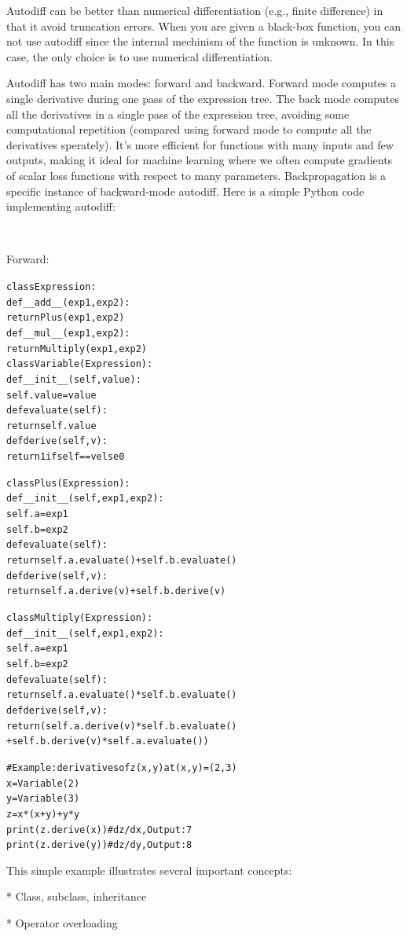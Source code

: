 \documentclass{article}
\newenvironment{tmcode}[1][]{\begin{alltt} }{\end{alltt}}
\begin{document}
Autodiff can be better than numerical differentiation (e.g., finite
difference) in that it avoid truncation errors. When you are given a black-box
function, you can not use autodiff since the internal mechinism of the
function is unknown. In this case, the only choice is to use numerical
differentiation.

Autodiff has two main modes: forward and backward. Forward mode computes a
single derivative during one pass of the expression tree. The back mode
computes all the derivatives in a single pass of the expression tree, avoiding
some computational repetition (compared using forward mode to compute all the
derivatives sperately). It's more efficient for functions with many inputs and
few outputs, making it ideal for machine learning where we often compute
gradients of scalar loss functions with respect to many parameters.
Backpropagation is a specific instance of backward-mode autodiff. Here is a
simple Python code implementing autodiff:

\

Forward:
\begin{tmcode}
class Expression:
    def __add__(exp1, exp2):
        return Plus(exp1, exp2)
    def __mul__(exp1, exp2):
        return Multiply(exp1,exp2)
class Variable(Expression):
    def __init__(self,value):
        self.value = value
    def evaluate(self):
        return self.value
    def derive(self, v):
        return 1 if self == v else 0

class Plus(Expression):
    def __init__(self,exp1,exp2):
        self.a = exp1
        self.b = exp2
    def evaluate(self):
        return self.a.evaluate() + self.b.evaluate()
    def derive(self,v):
        return self.a.derive(v) + self.b.derive(v)

class Multiply(Expression):
    def __init__(self,exp1,exp2):
        self.a = exp1
        self.b = exp2
    def evaluate(self):
        return self.a.evaluate() * self.b.evaluate()
    def derive(self, v):
        return (self.a.derive(v)*self.b.evaluate() 
               +self.b.derive(v)*self.a.evaluate())

# Example: derivatives of z(x,y) at (x, y) = (2, 3)
x = Variable(2)
y = Variable(3)
z = x * (x + y) + y * y
print(z.derive(x)) # dz/dx,  Output: 7
print(z.derive(y)) # dz/dy,  Output: 8
\end{tmcode}
This simple example illustrates several important concepts:

* Class, subclass, inheritance

* Operator overloading
\end{document}
